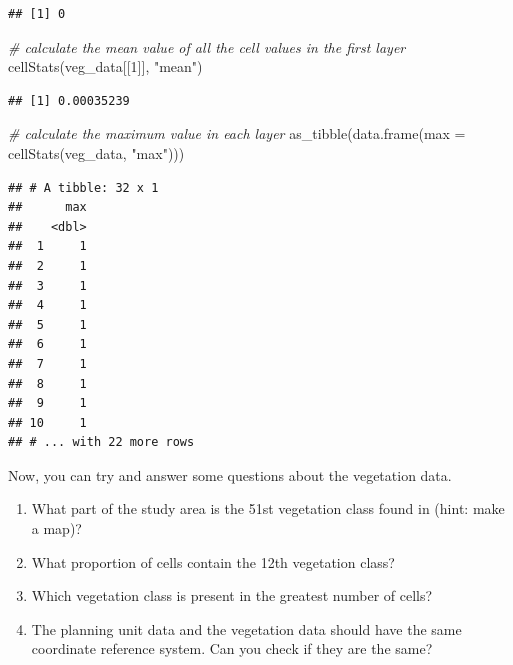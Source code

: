 \documentclass[
  12pt,
]{book}
\makeatletter
\newenvironment{Shaded}{\begin{snugshade}}{\end{snugshade}}
\newcommand{\AttributeTok}[1]{\textcolor[rgb]{0.77,0.63,0.00}{#1}}
\newcommand{\CommentTok}[1]{\textcolor[rgb]{0.56,0.35,0.01}{\textit{#1}}}
\newcommand{\DecValTok}[1]{\textcolor[rgb]{0.00,0.00,0.81}{#1}}
\newcommand{\FunctionTok}[1]{\textcolor[rgb]{0.00,0.00,0.00}{#1}}
\newcommand{\NormalTok}[1]{#1}
\newcommand{\StringTok}[1]{\textcolor[rgb]{0.31,0.60,0.02}{#1}}
\providecommand{\tightlist}{%
  \setlength{\itemsep}{0pt}\setlength{\parskip}{0pt}}
\newenvironment{kframe}{%
\medskip{}
\setlength{\fboxsep}{.8em}
 \def\at@end@of@kframe{}%
 \ifinner\ifhmode%
  \def\at@end@of@kframe{\end{minipage}}%
  \begin{minipage}{\columnwidth}%
 \fi\fi%
 \def\FrameCommand##1{\hskip\@totalleftmargin \hskip-\fboxsep
 \colorbox{shadecolor}{##1}\hskip-\fboxsep
     \hskip-\linewidth \hskip-\@totalleftmargin \hskip\columnwidth}%
 \MakeFramed {\advance\hsize-\width
   \@totalleftmargin\z@ \linewidth\hsize
   \@setminipage}}%
 {\par\unskip\endMakeFramed%
 \at@end@of@kframe}
\newenvironment{rmdblock}[1]
  {
  \begin{itemize}
  \renewcommand{\labelitemi}{
    \raisebox{-.7\height}[0pt][0pt]{
      {\setkeys{Gin}{width=3em,keepaspectratio}\texttt{[image: images/\#1]}}
    }
  }
  \setlength{\fboxsep}{1em}
  \begin{kframe}
  \item
  }
  {
  \end{kframe}
  \end{itemize}
  }
\newenvironment{rmdquestion}
  {\begin{rmdblock}{question}}
  {\end{rmdblock}}
\makeatother
\begin{document}
\begin{verbatim}
## [1] 0
\end{verbatim}

\begin{Shaded}
\begin{Highlighting}[]
\CommentTok{\# calculate the mean value of all the cell values in the first layer}
\FunctionTok{cellStats}\NormalTok{(veg\_data[[}\DecValTok{1}\NormalTok{]], }\StringTok{"mean"}\NormalTok{)}
\end{Highlighting}
\end{Shaded}

\begin{verbatim}
## [1] 0.00035239
\end{verbatim}

\clearpage

\begin{Shaded}
\begin{Highlighting}[]
\CommentTok{\# calculate the maximum value in each layer}
\FunctionTok{as\_tibble}\NormalTok{(}\FunctionTok{data.frame}\NormalTok{(}\AttributeTok{max =} \FunctionTok{cellStats}\NormalTok{(veg\_data, }\StringTok{"max"}\NormalTok{)))}
\end{Highlighting}
\end{Shaded}

\begin{verbatim}
## # A tibble: 32 x 1
##      max
##    <dbl>
##  1     1
##  2     1
##  3     1
##  4     1
##  5     1
##  6     1
##  7     1
##  8     1
##  9     1
## 10     1
## # ... with 22 more rows
\end{verbatim}

Now, you can try and answer some questions about the vegetation data.

\begin{rmdquestion}
\begin{enumerate}
\def\labelenumi{\arabic{enumi}.}
\tightlist
\item
  What part of the study area is the 51st vegetation class found in (hint: make a map)?
\item
  What proportion of cells contain the 12th vegetation class?
\item
  Which vegetation class is present in the greatest number of cells?
\item
  The planning unit data and the vegetation data should have the same coordinate reference system. Can you check if they are the same?
\end{enumerate}
\end{rmdquestion}
\end{document}
